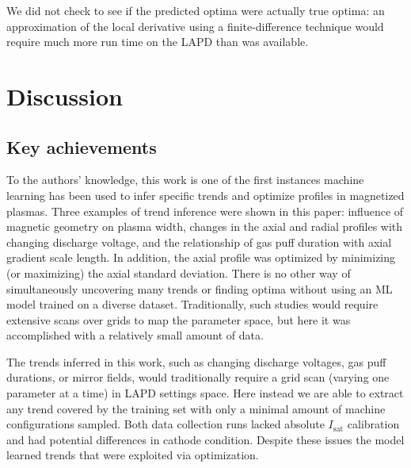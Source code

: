 We did not check to see if the predicted optima were actually true optima: an approximation of the local derivative using a finite-difference technique would require much more run time on the LAPD than was available. 

\section{Discussion}
\label{sec:discussion}

\subsection{Key achievements}

To the authors' knowledge, this work is one of the first instances machine learning has been used to infer specific trends and optimize profiles in magnetized plasmas. Three examples of trend inference were shown in this paper: influence of magnetic geometry on plasma width, changes in the axial and radial profiles with changing discharge voltage, and the relationship of gas puff duration with axial gradient scale length. In addition, the axial profile was optimized by minimizing (or maximizing) the axial standard deviation. There is no other way of simultaneously uncovering many trends or finding optima without using an ML model trained on a diverse dataset. Traditionally, such studies would require extensive scans over grids to map the parameter space, but here it was accomplished with a relatively small amount of data.


The trends inferred in this work, such as changing discharge voltages, gas puff durations, or mirror fields, would traditionally require a grid scan (varying one parameter at a time) in LAPD settings space. Here instead we are able to extract any trend covered by the training set with only a minimal amount of machine configurations sampled. Both data collection runs lacked absolute $I_\text{sat}$ calibration and had potential differences in cathode condition. Despite these issues the model learned trends that were exploited via optimization. 

